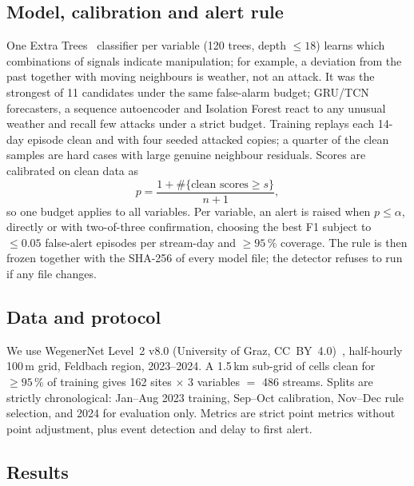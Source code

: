 \documentclass[conference]{IEEEtran}
\begin{document}
\subsection{Model, calibration and alert rule}
One Extra Trees~\cite{extratrees} classifier per variable (120 trees, depth $\leq 18$) learns which combinations of signals
indicate manipulation; for example, a deviation from the past together with moving neighbours is weather,
not an attack. It was the strongest of 11 candidates under the same false-alarm budget; GRU/TCN forecasters,
a sequence autoencoder and Isolation Forest react to any unusual weather and recall few attacks under a strict
budget. Training replays each 14-day episode clean and with four seeded attacked copies; a quarter of the
clean samples are hard cases with large genuine neighbour residuals. Scores are calibrated on clean data as
\begin{equation}
p = \frac{1 + \#\{\text{clean scores} \geq s\}}{n + 1},
\end{equation}
so one budget applies to all variables. Per variable, an alert is raised when $p \leq \alpha$, directly or
with two-of-three confirmation, choosing the best F1 subject to $\leq 0.05$ false-alert episodes per
stream-day and $\geq 95\,\%$ coverage. The rule is then frozen together with the SHA-256 of every model file;
the detector refuses to run if any file changes.

\subsection{Data and protocol}
We use WegenerNet Level~2 v8.0 (University of Graz, CC~BY~4.0)~\cite{wegenernet}, half-hourly 100\,m grid,
Feldbach region, 2023--2024. A 1.5\,km sub-grid of cells clean for $\geq 95\,\%$ of training gives 162 sites
$\times$ 3 variables $=$ 486 streams. Splits are strictly chronological: Jan--Aug 2023 training, Sep--Oct
calibration, Nov--Dec rule selection, and 2024 for evaluation only. Metrics are strict point metrics without
point adjustment, plus event detection and delay to first alert.

\subsection{Results}
\end{document}
